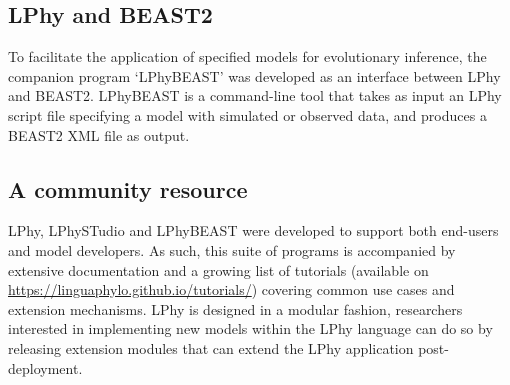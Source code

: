 \documentclass[10pt,letterpaper,table]{article}
\theoremstyle{definition}
\begin{document}
\subsection{LPhy and BEAST2}
\label{sec:lphybeast}
To facilitate the application of specified models for evolutionary inference, the companion program `LPhyBEAST' was developed as an interface between LPhy and BEAST2.
LPhyBEAST is a command-line tool that takes as input an LPhy script file specifying a model with simulated or observed data, and produces a BEAST2 XML file as output.

\subsection{A community resource}
LPhy, LPhySTudio and LPhyBEAST were developed to support both end-users and model developers.
As such, this suite of programs is accompanied by extensive documentation and a growing list of tutorials (available on \url{https://linguaphylo.github.io/tutorials/}) covering common use cases and extension mechanisms. 
LPhy is designed in a modular fashion, researchers interested in implementing new models within the LPhy language can do so by releasing extension modules that can extend the LPhy application post-deployment.


\end{document}
